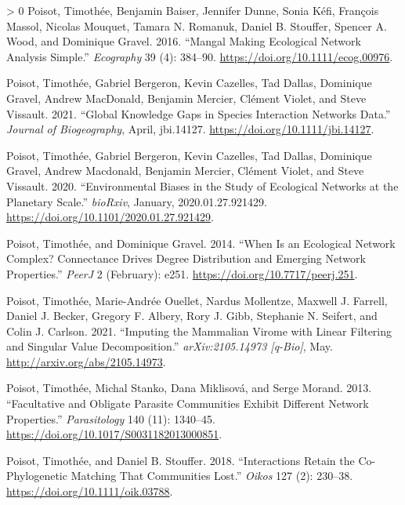 \documentclass[11pt]{article}
\newlength{\cslhangindent}
\newenvironment{CSLReferences}[3] %
 {%
  \setlength{\parindent}{0pt}
  \ifodd #1 \everypar{\setlength{\hangindent}{\cslhangindent}}\ignorespaces\fi
  \ifnum #2 > 0
  \setlength{\parskip}{#2\baselineskip}
  \fi
 }%
 {}
\begin{document}
\begin{CSLReferences}{1}{0}
\leavevmode\hypertarget{ref-Poisot2016ManMak}{}%
Poisot, Timothée, Benjamin Baiser, Jennifer Dunne, Sonia Kéfi, François
Massol, Nicolas Mouquet, Tamara N. Romanuk, Daniel B. Stouffer, Spencer
A. Wood, and Dominique Gravel. 2016. {``Mangal Making Ecological Network
Analysis Simple.''} \emph{Ecography} 39 (4): 384--90.
\url{https://doi.org/10.1111/ecog.00976}.

\leavevmode\hypertarget{ref-Poisot2021GloKno}{}%
Poisot, Timothée, Gabriel Bergeron, Kevin Cazelles, Tad Dallas,
Dominique Gravel, Andrew MacDonald, Benjamin Mercier, Clément Violet,
and Steve Vissault. 2021. {``Global Knowledge Gaps in Species
Interaction Networks Data.''} \emph{Journal of Biogeography}, April,
jbi.14127. \url{https://doi.org/10.1111/jbi.14127}.

\leavevmode\hypertarget{ref-Poisot2020EnvBia}{}%
Poisot, Timothée, Gabriel Bergeron, Kevin Cazelles, Tad Dallas,
Dominique Gravel, Andrew Macdonald, Benjamin Mercier, Clément Violet,
and Steve Vissault. 2020. {``Environmental Biases in the Study of
Ecological Networks at the Planetary Scale.''} \emph{bioRxiv}, January,
2020.01.27.921429. \url{https://doi.org/10.1101/2020.01.27.921429}.

\leavevmode\hypertarget{ref-Poisot2014WheEco}{}%
Poisot, Timothée, and Dominique Gravel. 2014. {``When Is an Ecological
Network Complex? Connectance Drives Degree Distribution and Emerging
Network Properties.''} \emph{PeerJ} 2 (February): e251.
\url{https://doi.org/10.7717/peerj.251}.

\leavevmode\hypertarget{ref-Poisot2021ImpMam}{}%
Poisot, Timothée, Marie-Andrée Ouellet, Nardus Mollentze, Maxwell J.
Farrell, Daniel J. Becker, Gregory F. Albery, Rory J. Gibb, Stephanie N.
Seifert, and Colin J. Carlson. 2021. {``Imputing the Mammalian Virome
with Linear Filtering and Singular Value Decomposition.''}
\emph{arXiv:2105.14973 {[}q-Bio{]}}, May.
\url{http://arxiv.org/abs/2105.14973}.

\leavevmode\hypertarget{ref-Poisot2013FacObl}{}%
Poisot, Timothée, Michal Stanko, Dana Miklisová, and Serge Morand. 2013.
{``Facultative and Obligate Parasite Communities Exhibit Different
Network Properties.''} \emph{Parasitology} 140 (11): 1340--45.
\url{https://doi.org/10.1017/S0031182013000851}.

\leavevmode\hypertarget{ref-Poisot2018IntRet}{}%
Poisot, Timothée, and Daniel B. Stouffer. 2018. {``Interactions Retain
the Co-Phylogenetic Matching That Communities Lost.''} \emph{Oikos} 127
(2): 230--38. \url{https://doi.org/10.1111/oik.03788}.


\end{CSLReferences}
\end{document}
